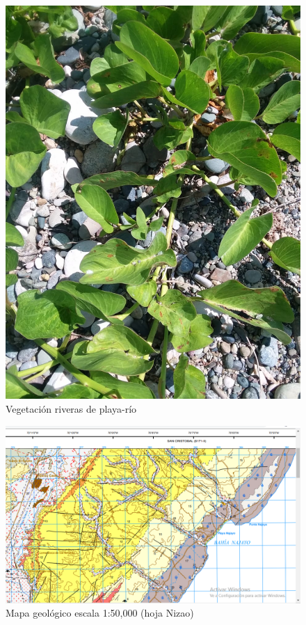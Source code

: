 \documentclass[11pt,]{article}
\begin{document}
\begin{figure}
\centering
\includegraphics{Ipomoea_Pescaprea.jpg}
\caption{Vegetación riveras de playa-río\label{ipomoea}}
\end{figure}

\begin{figure}
\centering
\includegraphics{mapa_bahia_najayo.png}
\caption{Mapa geológico escala 1:50,000 (hoja Nizao)\label{mapageo50k}}
\end{figure}
\end{document}
